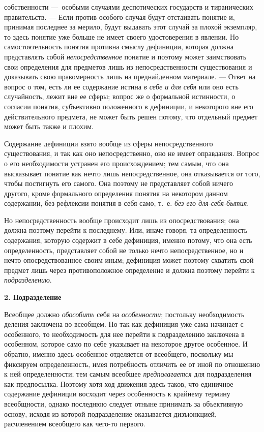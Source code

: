 \documentclass[twoside]{article}
\begin{document}
собственности —~особыми случаями деспотических государств и
тиранических правительств. — Если против особого случая
будут отстаивать понятие и, принимая последнее за мерило, будут выдавать
этот случай за плохой экземпляр, то здесь понятие уже больше не имеет
своего удостоверения в явлении. Но самостоятельность понятия противна
смыслу дефиниции, которая должна представлять собой
{\em непосредственное}
понятие и поэтому может заимствовать свои определения для
предметов лишь из непосредственности существования и доказывать свою
правомерность лишь на преднайденном материале. — Ответ на
вопрос о том, есть ли ее содержание истина
{\em в себе и для себя}
или оно есть случайность, лежит вне ее сферы; вопрос же о
формальной истинности, о согласии понятия, субъективно положенного в
дефиниции, и некоторого вне его действительного предмета, не может быть
решен потому, что отдельный предмет может быть также и плохим.

Содержание дефиниции взято вообще из сферы непосредственного
существования, и так как оно непосредственно, оно не имеет оправдания.
Вопрос о его необходимости устранен его происхождением; тем самым, что она
высказывает понятие как нечто лишь непосредственное, она отказывается от
того, чтобы постигнуть его самого. Она поэтому не представляет собой ничего
другого, кроме формального определения понятия на некотором данном
содержании, без рефлексии понятия в себя само, т.~е.
{\em без его для-себя-бытия}.

Но непосредственность вообще происходит лишь из
опосредствования; она должна поэтому перейти к последнему. Или,
иначе говоря, та определенность содержания, которую содержит
в себе дефиниция, именно потому, что она есть определенность, представляет
собой не только нечто непосредственное, но и нечто опосредствованное своим 
иным; дефиниция может поэтому схватить свой предмет лишь через
противоположное определение и должна поэтому перейти к
{\em подразделению}.

{\centering\bfseries 2. Подразделение \par}

Всеобщее должно
{\em обособить} себя на
{\em особенности};
постольку необходимость деления заключена во всеобщем. Но так
как дефиниция уже сама начинает с особенного, то необходимость для нее
перейти к подразделению заключена в особенном, которое само по себе
указывает на некоторое другое особенное. И обратно, именно здесь особенное
отделяется от всеобщего, поскольку мы фиксируем определенность, имея
потребность отличить ее от иной по отношению к ней определенности; тем
самым всеобщее {\em предполагается}
для подразделения как предпосылка. Поэтому хотя ход движения
здесь таков, что единичное содержание дефиниции восходит через особенность
к крайнему термину всеобщности, однако последнюю следует отныне принимать
за объективную основу, исходя из которой подразделение оказывается
дизъюнкцией, расчленением всеобщего как чего-то первого.
\end{document}
